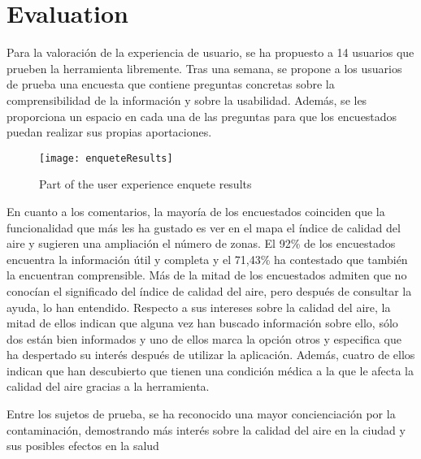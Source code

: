 \newpage
\section{Evaluation}
Para la valoración de la experiencia de usuario, se ha propuesto a 14 usuarios que prueben la herramienta libremente. 
Tras una semana, se propone a los usuarios de prueba una encuesta que contiene preguntas concretas sobre la comprensibilidad
de la información y sobre la usabilidad. Además, se les proporciona un espacio en cada una de las preguntas para que los
encuestados puedan realizar sus propias aportaciones. 

\begin{figure}[ht]
   \centering
   \texttt{[image: enqueteResults]}
   \caption{Part of the user experience enquete results}
\end{figure}

En cuanto a los comentarios, la mayoría de los encuestados coinciden que la funcionalidad que más les ha gustado es ver en el 
mapa el índice de calidad del aire y sugieren una ampliación el número de zonas.
El 92\% de los encuestados encuentra la información útil y completa y el 71,43\% ha contestado que también la encuentran 
comprensible.
Más de la mitad de los encuestados admiten que no conocían el significado del índice de calidad del aire, pero después de 
consultar la ayuda, lo han entendido.
Respecto a sus intereses sobre la calidad del aire, la mitad de ellos indican que alguna vez han buscado información sobre ello, 
sólo dos están bien informados y uno de ellos marca la opción otros y especifica que ha despertado su interés después de utilizar 
la aplicación.
Además, cuatro de ellos indican que han descubierto que tienen una condición médica a la que le afecta la calidad del aire gracias 
a la herramienta.

Entre los sujetos de prueba, se ha reconocido una mayor concienciación por la contaminación, demostrando más interés sobre la 
calidad del aire en la ciudad y sus posibles efectos en la salud


